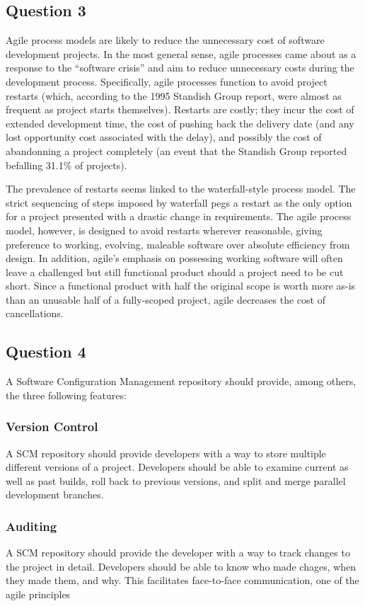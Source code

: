 \documentclass{article}
\begin{document}
\subsection*{Question 3}
Agile process models are likely to reduce the unnecessary cost of software development projects.  In the most general sense, agile processes came about as a response to the ``software crisis'' and aim to reduce unnecessary costs during the development process.  Specifically, agile processes function to avoid project restarts (which, according to the 1995 Standish Group report, were almost as frequent as project starts themselves).  Restarts are costly; they incur the cost of extended development time, the cost of pushing back the delivery date (and any lost opportunity cost associated with the delay), and possibly the cost of abandonning a project completely (an event that the Standish Group reported befalling 31.1\% of projects).  

The prevalence of restarts seems linked to the waterfall-style process model.  The strict sequencing of steps imposed by waterfall pegs a restart as the only option for a project presented with a drastic change in requirements.  The agile process model, however, is designed to avoid restarts wherever reasonable, giving preference to working, evolving, maleable software over absolute efficiency from design.  In addition, agile's emphasis on possessing working software will often leave a challenged but still functional product should a project need to be cut short.  Since a functional product with half the original scope is worth more as-is than an unusable half of a fully-scoped project, agile decreases the cost of cancellations.

\subsection*{Question 4}
A Software Configuration Management repository should provide, among others, the three following features:
\subsubsection*{Version Control}
A SCM repository should provide developers with a way to store multiple different versions of a project.  Developers should be able to examine current as well as past builds, roll back to previous versions, and split and merge parallel development branches.
\subsubsection*{Auditing}
A SCM repository should provide the developer with a way to track changes to the project in detail.  Developers should be able to know who made chages, when they made them, and why.  This facilitates face-to-face communication, one of the agile principles
\end{document}
